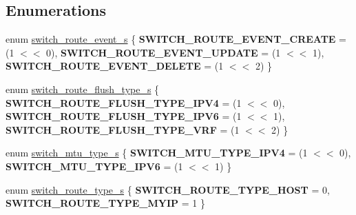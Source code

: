 \subsection*{Enumerations}
\begin{DoxyCompactItemize}
\item 
enum \hyperlink{group__L3_gaffd4b461af9b6cc9fcfca75ce2fd634f}{switch\+\_\+route\+\_\+event\+\_\+s} \{ {\bfseries S\+W\+I\+T\+C\+H\+\_\+\+R\+O\+U\+T\+E\+\_\+\+E\+V\+E\+N\+T\+\_\+\+C\+R\+E\+A\+T\+E} = (1 $<$$<$ 0), 
{\bfseries S\+W\+I\+T\+C\+H\+\_\+\+R\+O\+U\+T\+E\+\_\+\+E\+V\+E\+N\+T\+\_\+\+U\+P\+D\+A\+T\+E} = (1 $<$$<$ 1), 
{\bfseries S\+W\+I\+T\+C\+H\+\_\+\+R\+O\+U\+T\+E\+\_\+\+E\+V\+E\+N\+T\+\_\+\+D\+E\+L\+E\+T\+E} = (1 $<$$<$ 2)
 \}
\item 
enum \hyperlink{group__L3_ga629e27822edfaf923655db4dfb6f2c51}{switch\+\_\+route\+\_\+flush\+\_\+type\+\_\+s} \{ {\bfseries S\+W\+I\+T\+C\+H\+\_\+\+R\+O\+U\+T\+E\+\_\+\+F\+L\+U\+S\+H\+\_\+\+T\+Y\+P\+E\+\_\+\+I\+P\+V4} = (1 $<$$<$ 0), 
{\bfseries S\+W\+I\+T\+C\+H\+\_\+\+R\+O\+U\+T\+E\+\_\+\+F\+L\+U\+S\+H\+\_\+\+T\+Y\+P\+E\+\_\+\+I\+P\+V6} = (1 $<$$<$ 1), 
{\bfseries S\+W\+I\+T\+C\+H\+\_\+\+R\+O\+U\+T\+E\+\_\+\+F\+L\+U\+S\+H\+\_\+\+T\+Y\+P\+E\+\_\+\+V\+R\+F} = (1 $<$$<$ 2)
 \}
\item 
enum \hyperlink{group__L3_gae176e30748b79e1948c668298b13f675}{switch\+\_\+mtu\+\_\+type\+\_\+s} \{ {\bfseries S\+W\+I\+T\+C\+H\+\_\+\+M\+T\+U\+\_\+\+T\+Y\+P\+E\+\_\+\+I\+P\+V4} = (1 $<$$<$ 0), 
{\bfseries S\+W\+I\+T\+C\+H\+\_\+\+M\+T\+U\+\_\+\+T\+Y\+P\+E\+\_\+\+I\+P\+V6} = (1 $<$$<$ 1)
 \}
\item 
enum \hyperlink{group__L3_ga27765604c6e2ee42f80f5f5fcb98ec89}{switch\+\_\+route\+\_\+type\+\_\+s} \{ {\bfseries S\+W\+I\+T\+C\+H\+\_\+\+R\+O\+U\+T\+E\+\_\+\+T\+Y\+P\+E\+\_\+\+H\+O\+S\+T} = 0, 
{\bfseries S\+W\+I\+T\+C\+H\+\_\+\+R\+O\+U\+T\+E\+\_\+\+T\+Y\+P\+E\+\_\+\+M\+Y\+I\+P} = 1
 \}
\end{DoxyCompactItemize}
